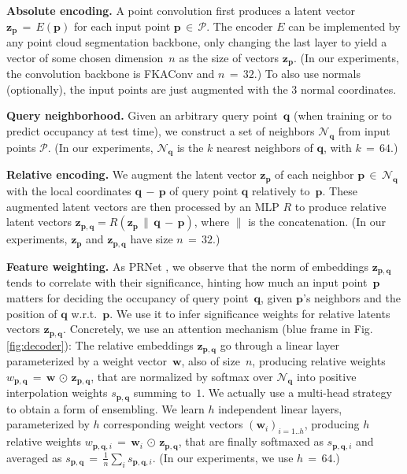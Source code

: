 \documentclass[10pt,twocolumn,letterpaper]{article}
\newcommand{\encoder}{E}
\newcommand{\latentv}{{\mathbf{z}}}
\newcommand{\neighbors}{{\mathcal{N}}}
\newcommand{\pointcloud}{{\mathcal{P}}}
\newcommand{\point}{{\mathbf{p}}}
\newcommand{\qpoint}{{\mathbf{q}}}
\newcommand{\relativizer}{R}
\newcommand{\significance}{s}
\newcommand{\weight}{w}
\newcommand{\weightv}{{\mathbf{w}}}
\begin{document}
\textbf{Absolute encoding.} 
A point convolution first produces a latent vector $\latentv_\point \,{=}\, \encoder(\point)$ for each input point $\point\,{\in}\,\pointcloud$. The encoder $E$ can be implemented by any point cloud segmentation backbone, only changing the last layer to yield a vector of some chosen dimension~$n$ as the size of vectors $\latentv_\point$. (In our experiments, the convolution backbone is FKAConv \cite{Boulch2020ACCV} and $n\,{=}\,32$.) To also use normals (optionally), the input points are just augmented with the 3 normal coordinates.

\textbf{Query neighborhood.} 
Given an arbitrary query point~$\qpoint$ (when training or to predict occupancy at test time), we construct a set of neighbors $\neighbors_\qpoint$ from input points $\pointcloud$. (In our experiments, $\neighbors_\qpoint$ is the $k$ nearest neighbors of $\qpoint$, with $k\,{=}\,64$.)

\textbf{Relative encoding.} 
We augment the latent vector $\latentv_\point$ of
each neighbor $\point \,{\in}\, \neighbors_\qpoint$ with the local coordinates $\qpoint \,{-}\, \point$ of query point $\qpoint$ relatively to~$\point$. These augmented latent vectors are then processed by an MLP $\relativizer$ to produce relative latent vectors $\latentv_{\point,\qpoint} = \relativizer(\latentv_\point \,\|\, \qpoint\,{-}\,\point)$, where $\|$ is the concatenation. (In our experiments, $\latentv_\point$ and $\latentv_{\point,\qpoint}$ have size $n\,{=}\,32$.)


\textbf{Feature weighting.}
As PRNet \cite{Wang2019NeurIPS}, we observe that the norm of embeddings $\latentv_{\point,\qpoint}$ tends to correlate with their significance, hinting how much an input point~$\point$ matters for deciding the occupancy of query point~$\qpoint$, given $\point$'s neighbors and the position of $\qpoint$ w.r.t.~$\point$.
We use it to infer significance weights for relative latents vectors $\latentv_{\point,\qpoint}$. Concretely, we use an attention mechanism (blue frame in Fig.\,\ref{fig:decoder}): The relative embeddings $\latentv_{\point,\qpoint}$ go through a linear layer parameterized by a weight vector~$\weightv$, also of size~$n$, producing relative weights $\weight_{\point,\qpoint} \,{=}\, \weightv \,\odot\, \latentv_{\point,\qpoint}$, that are normalized by softmax over $\neighbors_\qpoint$ into positive interpolation weights $\significance_{\point,\qpoint}$ summing to~$1$.
We actually use a multi-head strategy to obtain a form of ensembling. We learn $h$ independent linear layers, parameterized by $h$ corresponding weight vectors $(\weightv_i)_{i=1..h}$, producing $h$ relative weights $\weight_{\point,\qpoint,i} \,{=}\, \weightv_i \,\odot\, \latentv_{\point,\qpoint}$, that are finally softmaxed as $\significance_{\point,\qpoint,i}$ and averaged as $\significance_{\point,\qpoint} \,{=}\, \frac{1}{n} \sum_{i} \significance_{\point,\qpoint,i}$. (In our experiments, we use $h\,{=}\,64$.)
\end{document}
